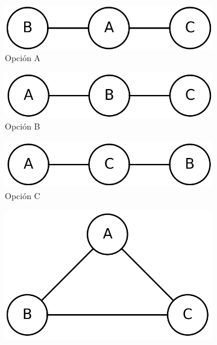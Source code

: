 \documentclass[12pt,a4paper]{article}
\begin{document}
\begin{enumerate}
    \begin{figure}[h!]
        \centering
        \begin{subfigure}{0.3\textwidth}
            \includegraphics[width=\textwidth]{graph321.png}
            \caption{Opción A}
            \label{fig:graph321}
        \end{subfigure}
        \hfill
        \begin{subfigure}{0.3\textwidth}
            \includegraphics[width=\textwidth]{graph322.png}
            \caption{Opción B}
            \label{fig:graph322}
        \end{subfigure}
        \hfill
        \begin{subfigure}{0.3\textwidth}
            \includegraphics[width=\textwidth]{graph323.png}
            \caption{Opción C}
            \label{fig:graph323}
        \end{subfigure}
        \hfill
        \begin{subfigure}{0.3\textwidth}
            \includegraphics[width=\textwidth]{graph324.png}

\end{subfigure}
\end{figure}
\end{enumerate}
\end{document}
